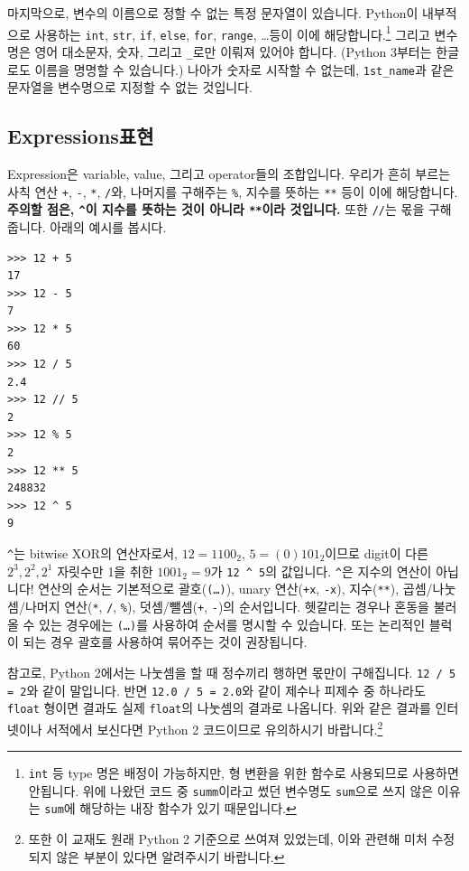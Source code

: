 \documentclass[../main.tex]{subfiles}
\begin{document}
마지막으로, 변수의 이름으로 정할 수 없는 특정 문자열이 있습니다.
Python이 내부적으로 사용하는 \texttt{int}, \texttt{str}, \texttt{if}, \texttt{else}, \texttt{for}, \texttt{range}, \dots 등이 이에 해당합니다.\footnote{\texttt{int} 등 type 명은 배정이 가능하지만, 형 변환을 위한 함수로 사용되므로 사용하면 안됩니다. 위에 나왔던 코드 중 \texttt{summ}이라고 썼던 변수명도 \texttt{sum}으로 쓰지 않은 이유는 \texttt{sum}에 해당하는 내장 함수가 있기 때문입니다.}
그리고 변수명은 영어 대소문자, 숫자, 그리고 \texttt{\_}로만 이뤄져 있어야 합니다.
(Python 3부터는 한글로도 이름을 명명할 수 있습니다.)
나아가 숫자로 시작할 수 없는데, \texttt{1st\_name}과 같은 문자열을 변수명으로 지정할 수 없는 것입니다.

\subsection{Expressions표현}
Expression은 variable, value, 그리고 operator들의 조합입니다.
우리가 흔히 부르는 사칙 연산 \texttt{+}, \texttt{-}, \texttt{*}, \texttt{/}와, 나머지를 구해주는 \texttt{\%}, 지수를 뜻하는 \texttt{**} 등이 이에 해당합니다.
\textbf{주의할 점은, \texttt{\^{}}이 지수를 뜻하는 것이 아니라 \texttt{**}이라 것입니다.}
또한 \texttt{//}는 몫을 구해줍니다.
아래의 예시를 봅시다.
\begin{verbatim}
>>> 12 + 5
17
>>> 12 - 5
7
>>> 12 * 5
60
>>> 12 / 5
2.4
>>> 12 // 5
2
>>> 12 % 5
2
>>> 12 ** 5
248832
>>> 12 ^ 5
9
\end{verbatim}
\texttt{\^{}}는 bitwise XOR의 연산자로서, $12 = 1100_2$, $5 = (0)101_2$이므로 digit이 다른 $2^3, 2^2, 2^1$ 자릿수만 1을 취한 $1001_2 = 9$가 \texttt{12 \^{} 5}의 값입니다.
\texttt{\^{}}은 지수의 연산이 아닙니다!
연산의 순서는 기본적으로 괄호(\texttt{(\dots)}), unary 연산(\texttt{+x}, \texttt{-x}), 지수(\texttt{**}), 곱셈/나눗셈/나머지 연산(\texttt{*}, \texttt{/}, \texttt{\%}), 덧셈/뺄셈(\texttt{+}, \texttt{-})의 순서입니다.
헷갈리는 경우나 혼동을 불러올 수 있는 경우에는 \texttt{(\dots)}를 사용하여 순서를 명시할 수 있습니다.
또는 논리적인 블럭이 되는 경우 괄호를 사용하여 묶어주는 것이 권장됩니다.

참고로, Python 2에서는 나눗셈을 할 때 정수끼리 행하면 몫만이 구해집니다.
\texttt{12 / 5 = 2}와 같이 말입니다.
반면 \texttt{12.0 / 5 = 2.0}와 같이 제수나 피제수 중 하나라도 \texttt{float} 형이면 결과도 실제 \texttt{float}의 나눗셈의 결과로 나옵니다.
위와 같은 결과를 인터넷이나 서적에서 보신다면 Python 2 코드이므로 유의하시기 바랍니다.\footnote{또한 이 교재도 원래 Python 2 기준으로 쓰여져 있었는데, 이와 관련해 미처 수정되지 않은 부분이 있다면 알려주시기 바랍니다.}
\end{document}

